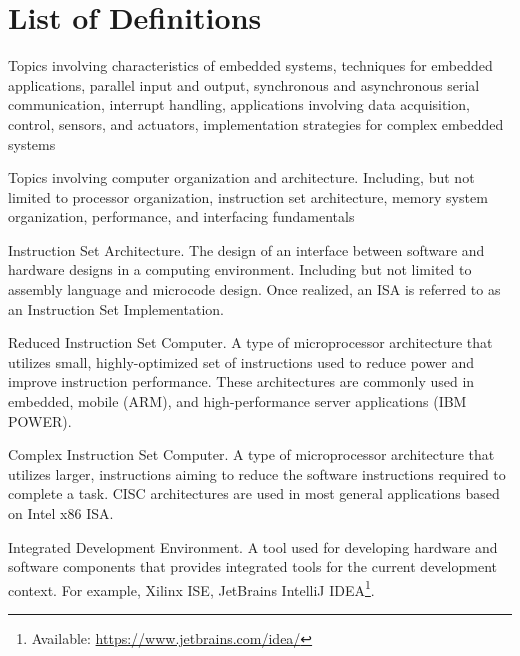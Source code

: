 
\chapter*{List of Definitions}

\begin{definition} 
	Topics involving characteristics of embedded systems, techniques for embedded applications, parallel input and output, synchronous and asynchronous serial communication, interrupt handling, applications involving data acquisition, control, sensors, and actuators, implementation strategies for complex embedded systems \cite[p.~118]{cec2016}
\end{definition}

\begin{definition} 
	Topics involving computer organization and architecture. Including, but not limited to processor organization, instruction set architecture, memory system organization, performance, and interfacing fundamentals\cite[p.~118]{cec2016}
\end{definition}

\begin{definition}[ISA]
    Instruction Set Architecture. The design of an interface between software and hardware designs in a computing environment. Including but not limited to assembly language and microcode design. Once realized, an ISA is referred to as an Instruction Set Implementation. 
\end{definition}

\begin{definition}[RISC]
    Reduced Instruction Set Computer. A type of microprocessor architecture that utilizes small, highly-optimized set of instructions used to reduce power and improve instruction performance\cite{Aletan1992, Stokes1999}. These architectures are commonly used in embedded, mobile (ARM), and high-performance server applications (IBM POWER). 
\end{definition}

\begin{definition}[CISC]
    Complex Instruction Set Computer. A type of microprocessor architecture that utilizes larger, instructions aiming to reduce the software instructions required to complete a task\cite{Aletan1992, Stokes1999}. CISC architectures are used in most general applications based on Intel\textregistered{} x86 ISA\cite{intel2017}.
\end{definition}

\begin{definition}[IDE]
    Integrated Development Environment. A tool used for developing hardware and software components that provides integrated tools for the current development context. For example, Xilinx ISE\cite{xilinxISE}, JetBrains IntelliJ IDEA\footnote{Available: \url{https://www.jetbrains.com/idea/}}.
\end{definition}


